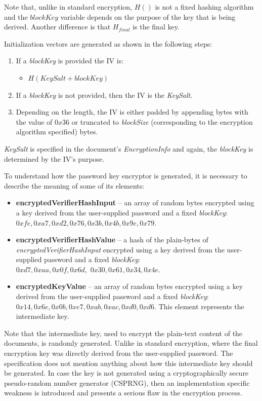 \documentclass[11pt,oneside]{fithesis2}
\begin{document}
Note that, unlike in standard encryption, $H()$ is not a fixed hashing algorithm and the $blockKey$ variable depends on the purpose of the key that is being derived. Another difference is that $H_{final}$ is the final key.

Initialization vectors are generated as shown in the following steps:
\begin{enumerate}\label{IVgen}
	\item{If a \textit{blockKey} is provided the IV is:}
	\begin{itemize}
		\item{$H(KeySalt + blockKey)$}
	\end{itemize}
	\item{If a \textit{blockKey} is not provided, then the IV is the \textit{KeySalt}.}
	\item{Depending on the length, the IV is either padded by appending bytes with the value of $0x36$ or truncated to \textit{blockSize} (corresponding to the encryption algorithm specified) bytes.}
\end{enumerate}

\textit{KeySalt} is specified in the document's \textit{EncryptionInfo} and again, the \textit{blockKey} is determined by the IV's purpose.

To understand how the password key encryptor is generated, it is necessary to describe the meaning of some of its elements:

\begin{itemize}
\setlength\itemsep{0.1em}
	\item{\textbf{encryptedVerifierHashInput} -- an array of random bytes encrypted using a key derived from the user-supplied password and a fixed \textit{blockKey}: $0xfe, 0xa7, 0xd2, 0x76, 0x3b, 0x4b, 0x9e, 0x79$.} 
	\item{\textbf{encryptedVerifierHashValue} -- a hash of the plain-bytes of \textit{encryptedVerifierHashInput} encrypted using a key derived from the user-supplied password and a fixed \textit{blockKey}:\\ $0xd7, 0xaa, 0x0f, 0x6d,$ $0x30, 0x61, 0x34, 0x4e$.}
	\item{\textbf{encryptedKeyValue} -- an array of random bytes encrypted using a key derived from the user-supplied password and a fixed \textit{blockKey}: $0x14, 0x6e, 0x0b, 0xe7, 0xab, 0xac, 0xd0, 0xd6$. This element represents the intermediate key.}
\end{itemize}

Note that the intermediate key, used to encrypt the plain-text content of the documents, is randomly generated. Unlike in standard encryption, where the final encryption key was directly derived from the user-supplied password. The specification does not mention anything about how this intermediate key should be generated. In case the key is not generated using a cryptographically secure pseudo-random number generator (CSPRNG), then an implementation specific weakness is introduced and presents a serious flaw in the encryption process. 
\end{document}
